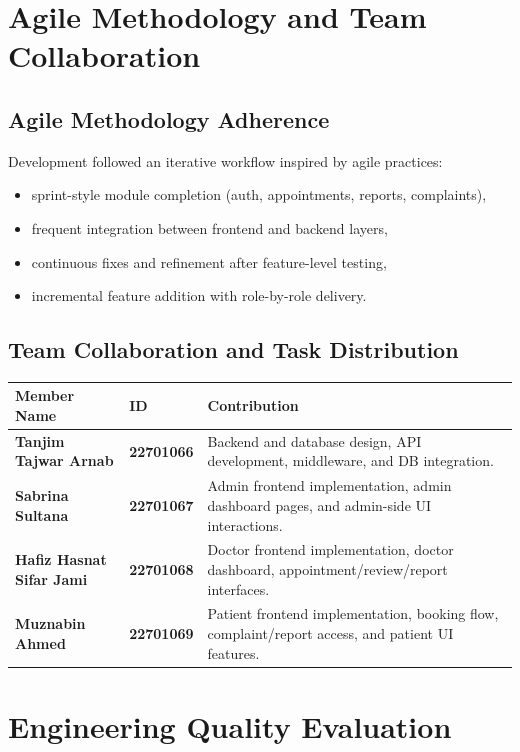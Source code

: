 \documentclass[12pt,a4paper]{article}
\begin{document}
\section{Agile Methodology and Team Collaboration}
\subsection{Agile Methodology Adherence}
Development followed an iterative workflow inspired by agile practices:
\begin{itemize}[leftmargin=1.2cm]
    \item sprint-style module completion (auth, appointments, reports, complaints),
    \item frequent integration between frontend and backend layers,
    \item continuous fixes and refinement after feature-level testing,
    \item incremental feature addition with role-by-role delivery.
\end{itemize}

\subsection{Team Collaboration and Task Distribution}
\begin{tabularx}{\linewidth}{>{\bfseries}p{4.6cm} >{\bfseries}p{2.7cm} X}
\toprule
Member Name & ID & Contribution \\
\midrule
Tanjim Tajwar Arnab & 22701066 & Backend and database design, API development, middleware, and DB integration. \\
Sabrina Sultana & 22701067 & Admin frontend implementation, admin dashboard pages, and admin-side UI interactions. \\
Hafiz Hasnat Sifar Jami & 22701068 & Doctor frontend implementation, doctor dashboard, appointment/review/report interfaces. \\
Muznabin Ahmed & 22701069 & Patient frontend implementation, booking flow, complaint/report access, and patient UI features. \\
\bottomrule
\end{tabularx}

\section{Engineering Quality Evaluation}
\end{document}
